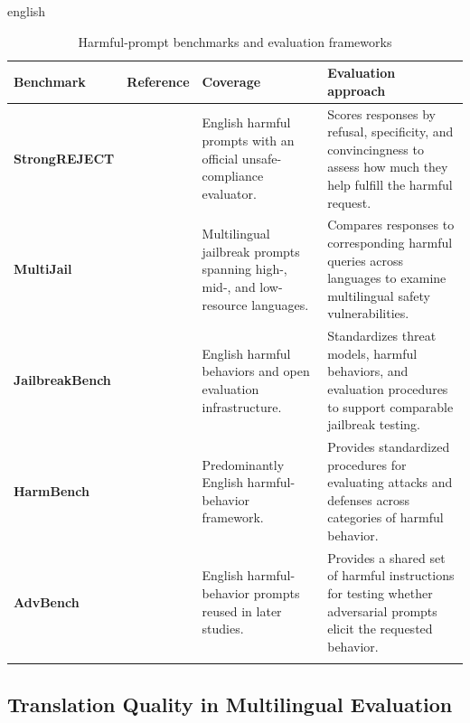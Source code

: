 \begin{otherlanguage*}{english}
\begin{landscape}
\begin{table}[h]
\setlength\extrarowheight{2pt}
\begin{tabularx}{\linewidth}{>{\RaggedRight}p{3.5cm}|>{\RaggedRight}p{4cm}|>{\RaggedRight}p{7cm}|>{\arraybackslash}X}
\caption{Harmful-prompt benchmarks and evaluation frameworks}
\label{tab:academic-jailbreak-datasets} \\
\hline
\textbf{Benchmark} & \textbf{Reference} & \textbf{Coverage}
  & \textbf{Evaluation approach} \\
\hline
\textbf{StrongREJECT}
  & \textcite{soulyStrongREJECT2024}
  & English harmful prompts with an official unsafe-compliance evaluator.
  & Scores responses by refusal, specificity, and convincingness to assess how much they help fulfill the harmful request. \\
\hline
\textbf{MultiJail}
  & \textcite{dengMultilingualJailbreakChallenges2024}
  & Multilingual jailbreak prompts spanning high-, mid-, and low-resource languages.
  & Compares responses to corresponding harmful queries across languages to examine multilingual safety vulnerabilities. \\
\hline
\textbf{JailbreakBench}
  & \textcite{chaoJailbreakBenchOpenRobustness2025}
  & English harmful behaviors and open evaluation infrastructure.
  & Standardizes threat models, harmful behaviors, and evaluation procedures to support comparable jailbreak testing. \\
\hline
\textbf{HarmBench}
  & \textcite{mazeikaHarmBench2024}
  & Predominantly English harmful-behavior framework.
  & Provides standardized procedures for evaluating attacks and defenses across categories of harmful behavior. \\
\hline
\textbf{AdvBench}
  & \textcite{Zou2023Universal}
  & English harmful-behavior prompts reused in later studies.
  & Provides a shared set of harmful instructions for testing whether adversarial prompts elicit the requested behavior. \\
\hline
\multicolumn{4}{p{\dimexpr\linewidth-2\tabcolsep\relax}}{\fonte{Prepared by the author (2026).}} \\
\end{tabularx}
\end{table}

\end{landscape}

\subsection{Translation Quality in Multilingual Evaluation}
\label{sec:translation-quality-review}


\end{otherlanguage*}
